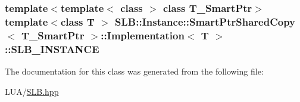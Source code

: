 \subsubsection[{\texorpdfstring{S\+L\+B\+\_\+\+I\+N\+S\+T\+A\+N\+CE}{SLB_INSTANCE}}]{\setlength{\rightskip}{0pt plus 5cm}template$<$template$<$ class $>$ class T\+\_\+\+Smart\+Ptr$>$ template$<$class T $>$ {\bf S\+L\+B\+::\+Instance\+::\+Smart\+Ptr\+Shared\+Copy}$<$ T\+\_\+\+Smart\+Ptr $>$\+::{\bf Implementation}$<$ T $>$\+::S\+L\+B\+\_\+\+I\+N\+S\+T\+A\+N\+CE\hspace{0.3cm}{\ttfamily [protected]}}\hypertarget{classSLB_1_1Instance_1_1SmartPtrSharedCopy_1_1Implementation_a4a2fc628b6921e3cad32cd0ea6824e6a}{}\label{classSLB_1_1Instance_1_1SmartPtrSharedCopy_1_1Implementation_a4a2fc628b6921e3cad32cd0ea6824e6a}


The documentation for this class was generated from the following file\+:\begin{DoxyCompactItemize}
\item 
L\+U\+A/\hyperlink{SLB_8hpp}{S\+L\+B.\+hpp}\end{DoxyCompactItemize}
